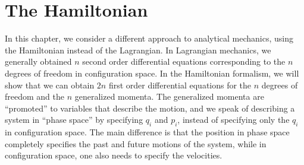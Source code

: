 %
\chapter{The Hamiltonian}
In this chapter, we consider a different approach to analytical mechanics, using the Hamiltonian instead of the Lagrangian. In Lagrangian mechanics, we generally obtained $n$ second order differential equations corresponding to the $n$ degrees of freedom in configuration space. In the Hamiltonian formalism, we will show that we can obtain $2n$ first order differential equations for the $n$ degrees of freedom and the $n$ generalized momenta. The generalized momenta are ``promoted'' to variables that describe the motion, and we speak of describing a system in ``phase space'' by specifying $q_i$ and $p_i$, instead of specifying only the $q_i$ in configuration space. The main difference is that the position in phase space completely specifies the past and future motions of the system, while in configuration space, one also needs to specify the velocities.

